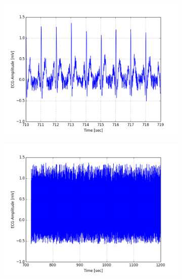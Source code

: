 \documentclass[paper=a4, fontsize=11pt]{scrartcl}
\numberwithin{equation}{section}		%
\numberwithin{figure}{section}			%
\numberwithin{table}{section}		    %
\begin{document}
\begin{appendices}
\begin{figure}[H]
	\centering
	\begin{subfigure}[b]{0.3\textwidth}
		\includegraphics[width=\textwidth]{sim/ecg_25}
	\end{subfigure}
	\begin{subfigure}[b]{0.3\textwidth}
		\includegraphics[width=\textwidth]{sim/ecg_26}
	\end{subfigure}
	\begin{subfigure}[b]{0.3\textwidth}

\end{subfigure}
\end{figure}
\end{appendices}
\end{document}
